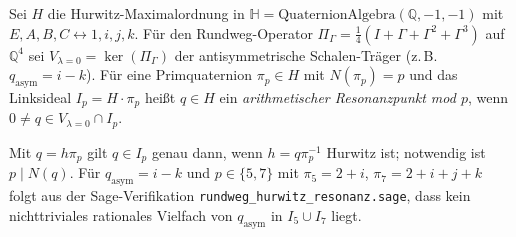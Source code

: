 \begin{definition}
Sei $H$ die Hurwitz-Maximalordnung in $\mathbb{H}=\mathrm{QuaternionAlgebra}(\mathbb{Q},-1,-1)$
mit $E,A,B,C \leftrightarrow 1,i,j,k$. Für den Rundweg-Operator
$\Pi_\Gamma=\frac14(I+\Gamma+\Gamma^2+\Gamma^3)$ auf $\mathbb{Q}^4$ sei
$V_{\lambda=0}=\ker(\Pi_\Gamma)$ der antisymmetrische Schalen-Träger
(z.\,B.\ $q_{\mathrm{asym}}=i-k$).
Für eine Primquaternion $\pi_p\in H$ mit $N(\pi_p)=p$ und das Linksideal $I_p=H\cdot\pi_p$
heißt $q\in H$ ein \emph{arithmetischer Resonanzpunkt mod $p$}, wenn
$0\neq q\in V_{\lambda=0}\cap I_p$.
\end{definition}
\begin{proposition}
Mit $q=h\pi_p$ gilt $q\in I_p$ genau dann, wenn $h=q\pi_p^{-1}$ Hurwitz ist;
notwendig ist $p\mid N(q)$. Für $q_{\mathrm{asym}}=i-k$ und $p\in\{5,7\}$
mit $\pi_5=2+i$, $\pi_7=2+i+j+k$ folgt aus der Sage-Verifikation
\texttt{rundweg\_hurwitz\_resonanz.sage}, dass kein nichttriviales rationales
Vielfach von $q_{\mathrm{asym}}$ in $I_5\cup I_7$ liegt.
\end{proposition}
